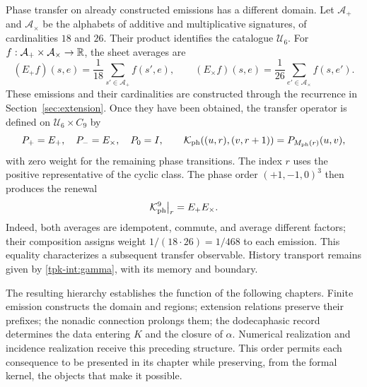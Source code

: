 Phase transfer on already constructed emissions has a different
domain. Let \(\mathcal A_+\) and \(\mathcal A_\times\) be the
alphabets of additive and multiplicative signatures, of cardinalities \(18\)
and \(26\). Their product identifies the catalogue \(\mathcal U_6\).
For \(f:\mathcal A_+\times\mathcal A_\times\to\mathbb R\),
the sheet averages are
\[
 (E_+f)(s,e)=\frac1{18}\sum_{s'\in\mathcal A_+}f(s',e),\qquad
 (E_\times f)(s,e)=\frac1{26}\sum_{e'\in\mathcal A_\times}f(s,e').
\]
These emissions and their cardinalities are constructed through
the recurrence in Section~\ref{sec:extension}. Once they have been obtained,
the transfer operator is defined on
\(\mathcal U_6\times C_9\) by
\[
 P_+=E_+,\quad P_-=E_\times,\quad P_0=I,\qquad
 \mathcal K_{\rm ph}((u,r),(v,r+1))=P_{M_{\rm ph}(r)}(u,v),
\]
with zero weight for the remaining phase transitions. The index
\(r\) uses the positive representative of the cyclic class.
The phase order \((+1,-1,0)^3\) then produces the renewal
\[
 \mathcal K_{\rm ph}^{9}\big|_r=E_+E_\times.
\]
Indeed, both averages are idempotent, commute, and average different
factors; their composition assigns weight \(1/(18\cdot26)=1/468\)
to each emission. This equality characterizes a subsequent transfer
observable. History transport remains given by
\eqref{tpk-int:gamma}, with its memory and boundary.

The resulting hierarchy establishes the function of the following chapters.
Finite emission constructs the domain and regions; extension relations
preserve their prefixes; the nonadic connection prolongs them; the
dodecaphasic record determines the data entering \(K\) and
the closure of \(\alpha\). Numerical realization and incidence
realization receive this preceding structure. This order permits
each consequence to be presented in its chapter while preserving, from the formal kernel,
the objects that make it possible.
